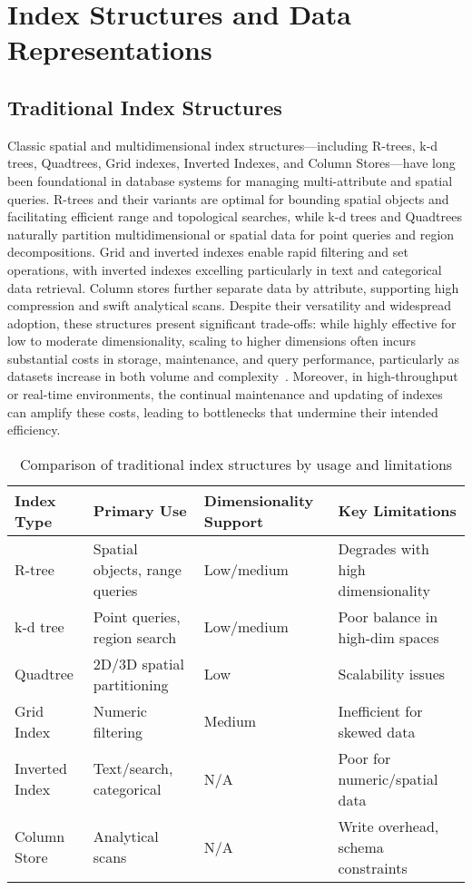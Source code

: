 \section{Index Structures and Data Representations}

\subsection{Traditional Index Structures}

Classic spatial and multidimensional index structures—including R-trees, k-d trees, Quadtrees, Grid indexes, Inverted Indexes, and Column Stores—have long been foundational in database systems for managing multi-attribute and spatial queries. R-trees and their variants are optimal for bounding spatial objects and facilitating efficient range and topological searches, while k-d trees and Quadtrees naturally partition multidimensional or spatial data for point queries and region decompositions. Grid and inverted indexes enable rapid filtering and set operations, with inverted indexes excelling particularly in text and categorical data retrieval. Column stores further separate data by attribute, supporting high compression and swift analytical scans. Despite their versatility and widespread adoption, these structures present significant trade-offs: while highly effective for low to moderate dimensionality, scaling to higher dimensions often incurs substantial costs in storage, maintenance, and query performance, particularly as datasets increase in both volume and complexity~\cite{ref111,ref112}. Moreover, in high-throughput or real-time environments, the continual maintenance and updating of indexes can amplify these costs, leading to bottlenecks that undermine their intended efficiency.

\begin{table*}[htbp]
\centering
\caption{Comparison of traditional index structures by usage and limitations}
\label{tab:traditional_indexes}
\begin{adjustbox}{max width=\textwidth}
\begin{tabular}{llll}
\toprule
\textbf{Index Type} & \textbf{Primary Use} & \textbf{Dimensionality Support} & \textbf{Key Limitations} \\
\midrule
R-tree & Spatial objects, range queries & Low/medium & Degrades with high dimensionality \\
k-d tree & Point queries, region search & Low/medium & Poor balance in high-dim spaces \\
Quadtree & 2D/3D spatial partitioning & Low & Scalability issues \\
Grid Index & Numeric filtering & Medium & Inefficient for skewed data \\
Inverted Index & Text/search, categorical & N/A & Poor for numeric/spatial data \\
Column Store & Analytical scans & N/A & Write overhead, schema constraints \\
\bottomrule
\end{tabular}
\end{adjustbox}
\end{table*}

